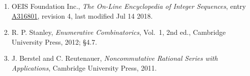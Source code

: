 \documentclass[11pt]{article}
\theoremstyle{definition}
\begin{document}
\begin{enumerate}

\item OEIS Foundation Inc., \emph{The On-Line Encyclopedia of Integer Sequences}, entry \href{https://oeis.org/A316801}{A316801}, revision 4, last modified Jul 14 2018.

\item R. P. Stanley, \emph{Enumerative Combinatorics}, Vol.~1, 2nd ed., Cambridge University Press, 2012; \S4.7.

\item J. Berstel and C. Reutenauer, \emph{Noncommutative Rational Series with Applications}, Cambridge University Press, 2011.

\end{enumerate}
\end{document}
